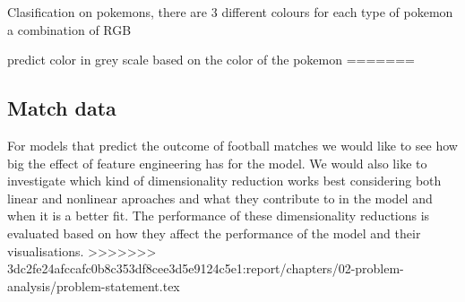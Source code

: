 Clasification on pokemons, there are 3 different colours for each type of pokemon a combination of RGB


predict color in grey scale based on the color of the pokemon
=======
\subsection{Match data}
For models that predict the outcome of football matches we would like to see how big the effect of feature engineering has for the model. We would also like to investigate which kind of dimensionality reduction works best considering both linear and nonlinear aproaches and what they contribute to in the model and when it is a better fit. The performance of these dimensionality reductions is evaluated based on how they affect the performance of the model and their visualisations.
>>>>>>> 3dc2fe24afccafc0b8c353df8cee3d5e9124c5e1:report/chapters/02-problem-analysis/problem-statement.tex
